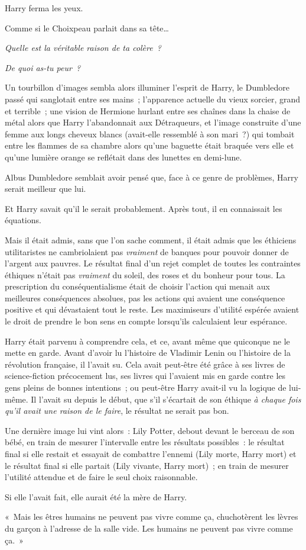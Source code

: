 Harry ferma les yeux.

Comme si le Choixpeau parlait dans sa tête…

\emph{Quelle est la véritable raison de ta colère~?}

\emph{De quoi as-tu peur~?}

Un tourbillon d'images sembla alors illuminer l'esprit de Harry, le Dumbledore passé qui sanglotait entre ses mains~; l'apparence actuelle du vieux sorcier, grand et terrible~; une vision de Hermione hurlant entre ses chaînes dans la chaise de métal alors que Harry l'abandonnait aux Détraqueurs, et l'image construite d'une femme aux longs cheveux blancs (avait-elle ressemblé à son mari~?) qui tombait entre les flammes de sa chambre alors qu'une baguette était braquée vers elle et qu'une lumière orange se reflétait dans des lunettes en demi-lune.

Albus Dumbledore semblait avoir pensé que, face à ce genre de problèmes, Harry serait meilleur que lui.

Et Harry savait qu'il le serait probablement.
Après tout, il en connaissait les équations.

Mais il était admis, sans que l'on sache comment, il était admis que les éthiciens utilitaristes ne cambriolaient pas \emph{vraiment} de banques pour pouvoir donner de l'argent aux pauvres.
Le résultat final d'un rejet complet de toutes les contraintes éthiques n'était pas \emph{vraiment} du soleil, des roses et du bonheur pour tous.
La prescription du conséquentialisme était de choisir l'action qui menait aux meilleures conséquences absolues, pas les actions qui avaient une conséquence positive et qui dévastaient tout le reste.
Les maximiseurs d'utilité espérée avaient le droit de prendre le bon sens en compte lorsqu'ils calculaient leur espérance.

Harry était parvenu à comprendre cela, et ce, avant même que quiconque ne le mette en garde.
Avant d'avoir lu l'histoire de Vladimir Lenin ou l'histoire de la révolution française, il l'avait su.
Cela avait peut-être été grâce à ses livres de science-fiction précocement lus, ses livres qui l'avaient mis en garde contre les gens pleins de bonnes intentions~; ou peut-être Harry avait-il vu la logique de lui-même.
Il l'avait su depuis le début, que s'il s'écartait de son éthique \emph{à chaque fois qu'il avait une raison de le faire}, le résultat ne serait pas bon.

Une dernière image lui vint alors~: Lily Potter, debout devant le berceau de son bébé, en train de mesurer l'intervalle entre les résultats possibles~: le résultat final si elle restait et essayait de combattre l'ennemi (Lily morte, Harry mort) et le résultat final si elle partait (Lily vivante, Harry mort)~; en train de mesurer l'utilité attendue et de faire le seul choix raisonnable.

Si elle l'avait fait, elle aurait été la mère de Harry.

«~Mais les êtres humains ne peuvent pas vivre comme ça, chuchotèrent les lèvres du garçon à l'adresse de la salle vide.
Les humains ne peuvent pas vivre comme ça.~»
